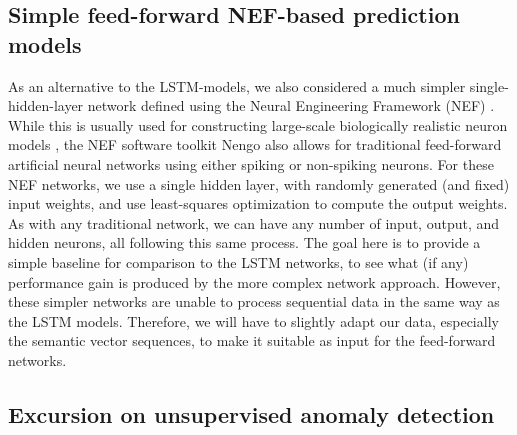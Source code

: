 \subsection{Simple feed-forward \acs{NEF}-based prediction models}%
\label{subsec:simple_feed_forward_nef_based_prediction_models}

As an alternative to the \ac{LSTM}-models, we also considered a much simpler single-hidden-layer network defined using the Neural Engineering Framework (\ac{NEF}) \cite{Eliasmith2003}.
While this is usually used for constructing large-scale biologically realistic neuron models \cite{Eliasmith2012}, the \ac{NEF} software toolkit \acs{Nengo} \cite{Bekolay2014} also allows for traditional feed-forward artificial neural networks using either spiking or non-spiking neurons.
For these \ac{NEF} networks, we use a single hidden layer, with randomly generated (and fixed) input weights, and use least-squares optimization to compute the output weights.
As with any traditional network, we can have any number of input, output, and hidden neurons, all following this same process.
The goal here is to provide a simple baseline for comparison to the \ac{LSTM} networks, to see what (if any) performance gain is produced by the more complex network approach.
However, these simpler networks are unable to process sequential data in the same way as the \ac{LSTM} models.
Therefore, we will have to slightly adapt our data, especially the semantic vector sequences, to make it suitable as input for the feed-forward networks.

\subsection{Excursion on unsupervised anomaly detection}%
\label{subsec:excursion_on_unsupervised_anomaly_detection}

